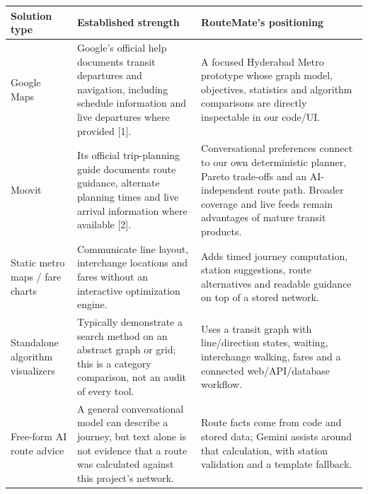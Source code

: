\documentclass[10pt,a4paper]{article}
\begin{document}
\begin{tabularx}{\linewidth}{@{}p{3cm} X X@{}}
\toprule
\textbf{Solution type} & \textbf{Established strength} & \textbf{RouteMate's positioning}\\\midrule
Google Maps & Google's official help documents transit departures and navigation, including schedule information and live departures where provided [1]. & A focused Hyderabad Metro prototype whose graph model, objectives, statistics and algorithm comparisons are directly inspectable in our code/UI.\\
Moovit & Its official trip-planning guide documents route guidance, alternate planning times and live arrival information where available [2]. & Conversational preferences connect to our own deterministic planner, Pareto trade-offs and an AI-independent route path. Broader coverage and live feeds remain advantages of mature transit products.\\
Static metro maps / fare charts & Communicate line layout, interchange locations and fares without an interactive optimization engine. & Adds timed journey computation, station suggestions, route alternatives and readable guidance on top of a stored network.\\
Standalone algorithm visualizers & Typically demonstrate a search method on an abstract graph or grid; this is a category comparison, not an audit of every tool. & Uses a transit graph with line/direction states, waiting, interchange walking, fares and a connected web/API/database workflow.\\
Free-form AI route advice & A general conversational model can describe a journey, but text alone is not evidence that a route was calculated against this project's network. & Route facts come from code and stored data; Gemini assists around that calculation, with station validation and a template fallback.\\\bottomrule
\end{tabularx}
\end{document}
